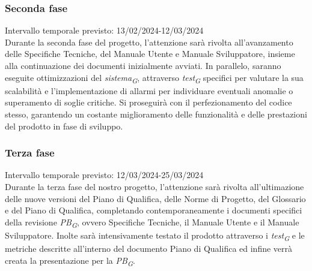\subsubsection{Seconda fase}
Intervallo temporale previsto: 13/02/2024-12/03/2024
\\ 
\vspace{0.2cm} 
Durante la seconda fase del progetto, l'attenzione sarà rivolta all'avanzamento delle Specifiche Tecniche, del Manuale Utente e Manuale Sviluppatore, insieme alla continuazione dei documenti inizialmente avviati. In parallelo, saranno eseguite ottimizzazioni del \textit{sistema}\textsubscript{\textit{G}}, attraverso \textit{test}\textsubscript{\textit{G}} specifici per valutare la sua scalabilità e l'implementazione di allarmi per individuare eventuali anomalie o superamento di soglie critiche. Si proseguirà con il perfezionamento del codice stesso, garantendo un costante miglioramento delle funzionalità e delle prestazioni del prodotto in fase di sviluppo.

\subsubsection{Terza fase}
Intervallo temporale previsto: 12/03/2024-25/03/2024\\ 
\vspace{0.2cm} 
Durante la terza fase del nostro progetto, l'attenzione sarà rivolta all'ultimazione delle nuove versioni del Piano di Qualifica, delle Norme di Progetto, del Glossario e del Piano di Qualifica, completando contemporaneamente i documenti specifici della revisione \textit{PB}\textsubscript{\textit{G}}, ovvero Specifiche Tecniche, il Manuale Utente e il Manuale Sviluppatore. Inolte sarà intensivamente testato il prodotto attraverso i \textit{test}\textsubscript{\textit{G}} e le metriche descritte all'interno del documento Piano di Qualifica ed infine verrà creata la presentazione per la \textit{PB}\textsubscript{\textit{G}}.
